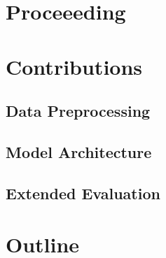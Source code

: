 

\section{Proceeeding}
\label{ch:intro-proceeeding}



\section{Contributions}
\label{ch:intro-contributions}

\subsection{Data Preprocessing}
\label{ch:intro-contributions-dataPreprocessing}


\subsection{Model Architecture} %
\label{ch:intro-contributions-modelArchitecture}


\subsection{Extended Evaluation}
\label{ch:intro-contributions-extendedEvaluation}



\section{Outline}
\label{ch:intro-outline}
